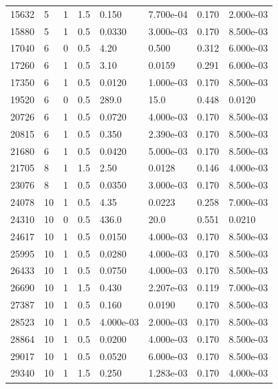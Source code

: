\documentclass[preview]{standalone}
\begin{document}
{{\begin{tabular}{L{1.2cm}C{1.2cm} C{0.3cm}C{0.5cm} C{1.4cm}C{1.4cm} C{1.4cm}C{1.4cm}}
  15632  &     5  & 1     & 1.5 &  0.150  & 7.700e-04  & 0.170 &  2.000e-03   \\ 
  15880  &     5  & 1     & 0.5 &  0.0330  & 3.000e-03  & 0.170 &  8.500e-03   \\ 
  17040  &     6  & 0     & 0.5 &  4.20  & 0.500  & 0.312 &  6.000e-03   \\ 
  17260  &     6  & 1     & 0.5 &  3.10  & 0.0159  & 0.291 &  6.000e-03   \\ 
  17350  &     6  & 1     & 0.5 &  0.0120  & 1.000e-03  & 0.170 &  8.500e-03   \\ 
  19520  &     6  & 0     & 0.5 &  289.0  & 15.0  & 0.448 &  0.0120   \\ 
  20726  &     6  & 1     & 0.5 &  0.0720  & 4.000e-03  & 0.170 &  8.500e-03   \\ 
  20815  &     6  & 1     & 0.5 &  0.350  & 2.390e-03  & 0.170 &  8.500e-03   \\ 
  21680  &     6  & 1     & 0.5 &  0.0420  & 5.000e-03  & 0.170 &  8.500e-03   \\ 
  21705  &     8  & 1     & 1.5 &  2.50  & 0.0128  & 0.146 &  4.000e-03   \\ 
  23076  &     8  & 1     & 0.5 &  0.0350  & 3.000e-03  & 0.170 &  8.500e-03   \\ 
  24078  &    10  & 1     & 0.5 &  4.35  & 0.0223  & 0.258 &  7.000e-03   \\ 
  24310  &    10  & 0     & 0.5 &  436.0  & 20.0  & 0.551 &  0.0210   \\ 
  24617  &    10  & 1     & 0.5 &  0.0150  & 4.000e-03  & 0.170 &  8.500e-03   \\ 
  25995  &    10  & 1     & 0.5 &  0.0280  & 4.000e-03  & 0.170 &  8.500e-03   \\ 
  26433  &    10  & 1     & 0.5 &  0.0750  & 4.000e-03  & 0.170 &  8.500e-03   \\ 
  26690  &    10  & 1     & 1.5 &  0.430  & 2.207e-03  & 0.119 &  7.000e-03   \\ 
  27387  &    10  & 1     & 0.5 &  0.160  & 0.0190  & 0.170 &  8.500e-03   \\ 
  28523  &    10  & 1     & 0.5 &  4.000e-03  & 2.000e-03  & 0.170 &  8.500e-03   \\ 
  28864  &    10  & 1     & 0.5 &  0.0200  & 4.000e-03  & 0.170 &  8.500e-03   \\ 
  29017  &    10  & 1     & 0.5 &  0.0520  & 6.000e-03  & 0.170 &  8.500e-03   \\ 
  29340  &    10  & 1     & 1.5 &  0.250  & 1.283e-03  & 0.170 &  4.000e-03   \\ 

\end{tabular}}}
\end{document}
